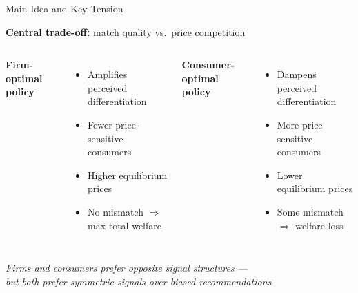 \documentclass[aspectratio=169, 11pt]{beamer}
\begin{document}
\begin{frame}{Main Idea and Key Tension}

\textbf{Central trade-off:} \; match quality \; vs.\ price competition

\bigskip

\begin{columns}[T]
\textbf{Firm-optimal policy}
\begin{itemize}
    \item Amplifies perceived differentiation
    \item Fewer price-sensitive consumers
    \item Higher equilibrium prices
    \item \alert{No mismatch} $\Rightarrow$ max total welfare
\end{itemize}

\textbf{Consumer-optimal policy}
\begin{itemize}
    \item Dampens perceived differentiation
    \item More price-sensitive consumers
    \item Lower equilibrium prices
    \item \alert{Some mismatch} $\Rightarrow$ welfare loss
\end{itemize}
\end{columns}

\bigskip

\centering
\textit{Firms and consumers prefer opposite signal structures --- \\
but both prefer symmetric signals over biased recommendations}

\end{frame}
\end{document}
